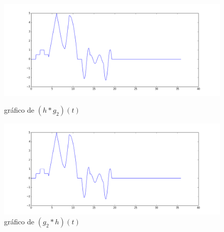 \documentclass[12pt]{article}
\begin{document}
\begin{figure}[!h]
	\centering
	\begin{minipage}[b]{0.49\linewidth}
		\includegraphics[width=1.15\linewidth]{h*g2.png}
		\caption{gráfico de $(h*g_2)(t)$}
	\end{minipage}
	\hfill
	\begin{minipage}[b]{0.49\linewidth}
		\includegraphics[width=1.15\linewidth]{g2*h.png}
		\caption{gráfico de $(g_2*h)(t)$}
	\end{minipage}
\end{figure}
\end{document}
